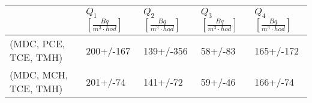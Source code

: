 \begin{tabular}{lllll}
\toprule
{} & $Q_1$ $\left[\si{\frac{Bq}{m^3\cdot hod}}\right]$ & $Q_2$ $\left[\si{\frac{Bq}{m^3\cdot hod}}\right]$ & $Q_3$ $\left[\si{\frac{Bq}{m^3\cdot hod}}\right]$ & $Q_4$ $\left[\si{\frac{Bq}{m^3\cdot hod}}\right]$ \\
\midrule
(MDC, PCE, TCE, TMH) &200+/-167 &139+/-356 &58+/-83 &165+/-172 \\
(MDC, MCH, TCE, TMH) & 201+/-74 & 141+/-72 &59+/-46 & 166+/-74 \\
\bottomrule
\end{tabular}
